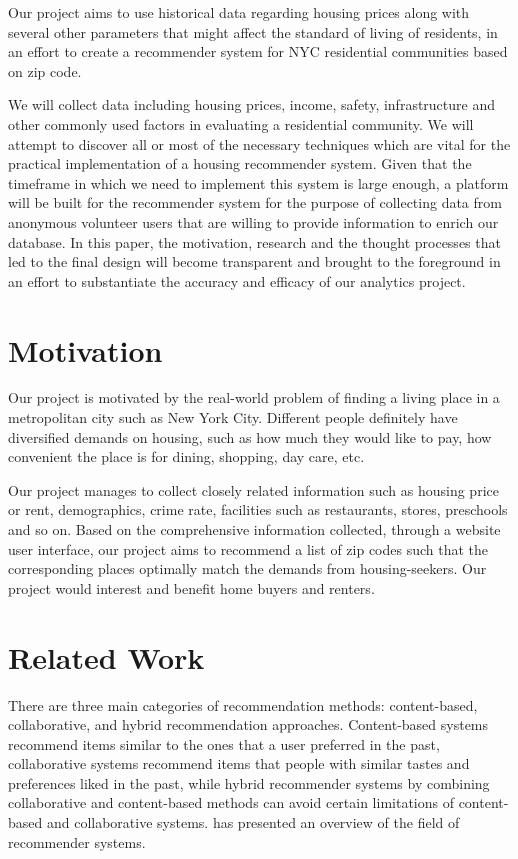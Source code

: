 \documentclass[letterpaper,twocolumn,10pt]{article}
\begin{document}
Our project aims to use historical data regarding housing prices along with several other parameters that might affect the standard of living of residents, in an effort to create a recommender system for NYC residential communities based on zip code. 

We will collect data including housing prices, income, safety, infrastructure and other commonly used factors in evaluating a residential community. We will attempt to discover all or most of the necessary techniques which are vital for the practical implementation of a housing recommender system. Given that  the timeframe in which we need to implement this system is large enough, a platform will be built for the recommender system for the purpose of collecting data from anonymous volunteer users that are willing to provide information to enrich our database.
In this paper, the motivation, research and the thought processes that led to the final design will become transparent and brought to the foreground in an effort to substantiate the accuracy and efficacy of our analytics project.


\section{Motivation}
Our project is motivated by the real-world problem of finding a living place in a metropolitan city such as New York City. Different people definitely have diversified demands on housing, such as how much they would like to pay, how convenient the place is for dining, shopping, day care, etc.

 Our project manages to collect  closely related information such as housing price or rent, demographics, crime rate, facilities such as restaurants, stores, preschools and so on. Based on the comprehensive information collected, through a website user interface, our project  aims to recommend a list of zip codes such that the corresponding places optimally match the demands from housing-seekers. Our project would interest and benefit home buyers and renters.


\section{Related Work}
There are three main categories of recommendation methods:  content-based, collaborative, and hybrid recommendation approaches. 
 Content-based systems recommend items similar to the ones that a user preferred in the past,  collaborative systems recommend items  that people with similar tastes and preferences liked in the past, while  hybrid recommender systems by combining collaborative and content-based methods  can avoid certain limitations of content-based and collaborative systems. \cite{AT05} has presented an overview of the field of recommender systems.
 
\end{document}
